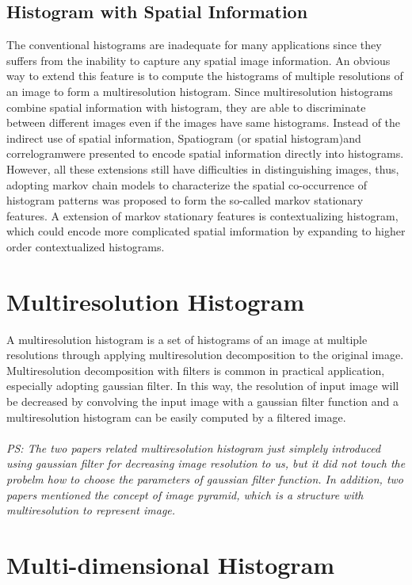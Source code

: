 \documentclass{article}
\begin{document}
\subsection{Histogram with Spatial Information}
The conventional histograms are inadequate for many applications since they suffers from the inability to capture any spatial image information. An obvious way to extend this feature is to compute the histograms of multiple resolutions of an image to form a multiresolution histogram. Since multiresolution histograms combine spatial information with histogram, they are able to discriminate between different images even if the images have same histograms\cite{Hadjidemetriou2001,Hadjidemetriou2004}. Instead of the indirect use of spatial information, Spatiogram (or spatial histogram)\cite{Birchfield2005}and correlogram\cite{Huang}were presented to encode spatial information directly into histograms. However, all these extensions still have difficulties in distinguishing images, thus, adopting markov chain models to characterize the spatial co-occurrence of histogram patterns was proposed to form the so-called markov stationary features\cite{Li2008}. A extension of markov stationary features is contextualizing histogram, which could encode more complicated spatial imformation by expanding to higher order contextualized histograms\cite{Kassim2009,Feng2012}. 
\section{Multiresolution Histogram}
A multiresolution histogram is a set of histograms of an image at multiple resolutions through applying multiresolution decomposition to the original image. Multiresolution decomposition with filters is common in practical application, especially adopting gaussian filter. In this way, the resolution of input image will be decreased by convolving the input image with a gaussian filter function and a multiresolution histogram can be easily computed by a filtered image\cite{Hadjidemetriou2001,Hadjidemetriou2004}. \\
\\
\emph{PS: The two papers related multiresolution histogram just simplely introduced using gaussian filter for decreasing image resolution to us, but it did not touch the probelm how to choose the parameters of gaussian filter function. In addition, two papers mentioned the concept of image pyramid, which is a structure with multiresolution to represent image.}
\section{Multi-dimensional Histogram}




\end{document}
